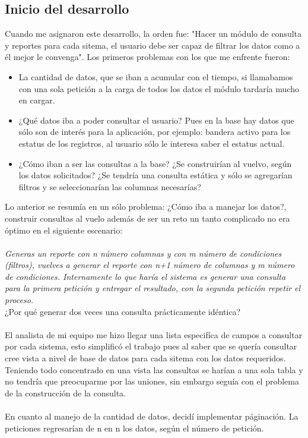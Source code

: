 \documentclass[../reportesINE.tex]{subfiles}
\begin{document}
\subsection{Inicio del desarrollo}
Cuando me asignaron este desarrollo, la orden fue: "Hacer un módulo de consulta y reportes para cada sitema, el usuario debe ser capaz de filtrar los datos como a él mejor le convenga". Los primeros problemas con los que me enfrente fueron: 
\begin{itemize}
\item La cantidad de datos, que se iban a acumular con el tiempo, si llamabamos con una sola petición a la carga de todos los datos el módulo tardaría mucho en cargar. 
\item ¿Qué datos iba a poder consultar el usuario? Pues en la base hay datos que sólo son de interés para la aplicación, por ejemplo: bandera activo para los estatus de los registros, al usuario sólo le interesa saber el estatus actual.
\item ¿Cómo iban a ser las consultas a la base? ¿Se construirían al vuelvo, según los datos solicitados? ¿Se tendría una consulta estática y sólo se agregarían filtros y se seleccionarían las columnas necesarías?
\end{itemize}
Lo anterior se resumía en un sólo problema: ¿Cómo iba a manejar los datos?, construir consultas al vuelo además de ser un reto un tanto complicado no era óptimo en el siguiente escenario: \\ \\
\textit{Generas un reporte con n número columnas y con m número de condiciones (filtros), vuelves a generar el reporte con n+1 número de columnas y m número de condiciones. Internamente lo que haría el sistema es generar una consulta para la primera petición y entregar el resultado, con la segunda petición repetir el proceso.} \\ ¿Por qué generar dos veces una consulta prácticamente idéntica? \\ \\
El analista de mi equipo me hizo llegar una lista especifíca de campos a consultar por cada sistema, esto simplificó el trabajo pues al saber que se quería consultar cree vista a nivel de base de datos para cada sitema con los datos requeridos. Teniendo todo concentrado en una vista las consultas se harían a una sola tabla y no tendría que preocuparme por las uniones,  sin embargo seguía con el problema de la construcción de la consulta. \\ \\
En cuanto al manejo de la cantidad de datos, decidí implementar páginación. La peticiones regresarían de n en n los datos, según el número de petición. 
\end{document}
